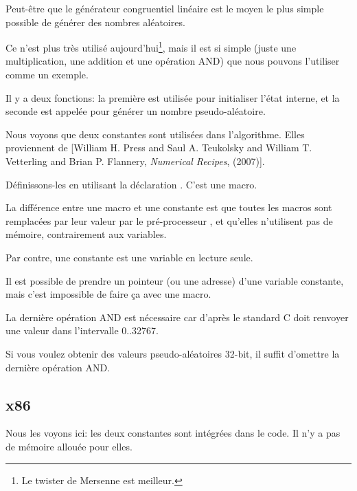 \label{LCG_simple}

Peut-être que le générateur congruentiel linéaire est le moyen le plus simple possible
de générer des nombres aléatoires.

Ce n'est plus très utilisé aujourd'hui\footnote{Le twister de Mersenne est meilleur.},
mais il est si simple (juste une multiplication, une addition et une opération AND)
que nous pouvons l'utiliser comme un exemple.



Il y a deux fonctions: la première est utilisée pour initialiser l'état interne,
et la seconde est appelée pour générer un nombre pseudo-aléatoire.

Nous voyons que deux constantes sont utilisées dans l'algorithme.
Elles proviennent de
[William H. Press and Saul A. Teukolsky and William T. Vetterling and Brian P. Flannery, \emph{Numerical Recipes}, (2007)].

Définissons-les en utilisant la déclaration \CCpp {}. C'est une macro.

La différence entre une macro \CCpp et une constante est que toutes les macros sont
remplacées par leur valeur par le pré-processeur \CCpp, et qu'elles n'utilisent pas
de mémoire, contrairement aux variables.

Par contre, une constante est une variable en lecture seule.

Il est possible de prendre un pointeur (ou une adresse) d'une variable constante,
mais c'est impossible de faire ça avec une macro.

La dernière opération AND est nécessaire car d'après le standard C 
doit renvoyer une valeur dans l'intervalle 0..32767.

Si vous voulez obtenir des valeurs pseudo-aléatoires 32-bit, il suffit d'omettre
la dernière opération AND.

\subsection{x86}



Nous les voyons ici: les deux constantes sont intégrées dans le code.
Il n'y a pas de mémoire allouée pour elles.

